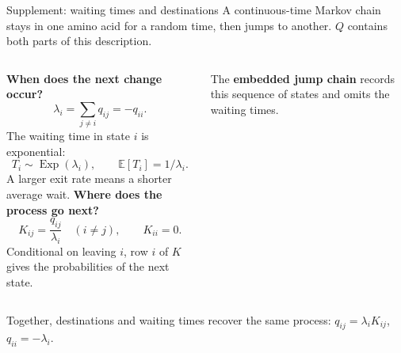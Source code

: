 \documentclass[aspectratio=169,11pt]{beamer}
\begin{document}
\begingroup
{}
\begin{frame}{Supplement: waiting times and destinations}
\small
A continuous-time Markov chain stays in one amino acid for a random time,
then jumps to another. $Q$ contains both parts of this description.

\vspace{2mm}
\begin{columns}[T,onlytextwidth]
\textbf{When does the next change occur?}
\[
 \lambda_i=\sum_{j\ne i}q_{ij}=-q_{ii}.
\]
The waiting time in state $i$ is exponential:
\[
 T_i\sim\operatorname{Exp}(\lambda_i),\qquad
 \mathbb E[T_i]=1/\lambda_i.
\]
A larger exit rate means a shorter average wait.
\textbf{Where does the process go next?}
\[
 K_{ij}=\frac{q_{ij}}{\lambda_i}\quad(i\ne j),\qquad K_{ii}=0.
\]
Conditional on leaving $i$, row $i$ of $K$ gives the probabilities of the next state.

The \textbf{embedded jump chain} records this sequence of states and omits the waiting times.
\end{columns}
\vspace{3mm}
\alert{Together, destinations and waiting times recover the same process:
$q_{ij}=\lambda_iK_{ij}$, $q_{ii}=-\lambda_i$.}
\end{frame}
\endgroup
\end{document}

